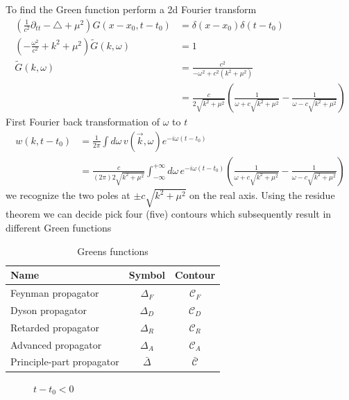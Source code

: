 \documentclass[10pt,a4paper]{book}
\theoremstyle{definition}
\begin{document}
\begin{itemize}
\begin{enumerate}
To find the Green function perform a 2d Fourier transform
\begin{align}
\left(\frac{1}{c^2}\partial_{tt}-\triangle+\mu^2\right) G(x-x_0,t-t_0)&= \delta(x-x_0)\delta(t-t_0)\\
\left(-\frac{\omega^2}{c^2}+k^2+\mu^2\right)\tilde{G}(k,\omega)&=1\\
\tilde{G}(k,\omega)
&=\frac{c^2}{-\omega^2+c^2(k^2+\mu^2)}\\
&=\frac{c}{2\sqrt{k^2+\mu^2}}\left(\frac{1}{\omega+c\sqrt{k^2+\mu^2}}-\frac{1}{\omega-c\sqrt{k^2+\mu^2}}\right)
\end{align}
First Fourier back transformation of $\omega$ to $t$
\begin{align}
w(k,t-t_0)&=\frac{1}{2\pi}\int d\omega\,v(\vec{k},\omega)e^{-i\omega(t-t_0)}\\
&=\frac{c}{(2\pi)2\sqrt{k^2+\mu^2}}\int_{-\infty}^{+\infty} d\omega\,e^{-i\omega(t-t_0)}\left(\frac{1}{\omega+c\sqrt{k^2+\mu^2}}-\frac{1}{\omega-c\sqrt{k^2+\mu^2}}\right)
\end{align}
we recognize the two poles at $\pm c\sqrt{k^2+\mu^2}$ on the real axis. Using the residue theorem we can decide pick four (five) contours which subsequently result in different Green functions

\begin{table}
\centering
\begin{tabular}{|l|c|c|}
\hline 
Name & Symbol & Contour \\ 
\hline 
Feynman propagator        & $\Delta_F$     & $\mathcal{C}_F$ \\
Dyson propagator          & $\Delta_D$     & $\mathcal{C}_D$ \\
Retarded propagator       & $\Delta_R$     & $\mathcal{C}_R$ \\
Advanced propagator       & $\Delta_A$     & $\mathcal{C}_A$ \\
Principle-part propagator & $\bar{\Delta}$ & $\bar{\mathcal{C}}$ \\
\hline 
\end{tabular} 
\caption{Greens functions}
\end{table}

\begin{figure}[!h]
$t-t_0<0$\newline
\begin{center}
\end{center}
\end{figure}
\end{enumerate}
\end{itemize}
\end{document}
